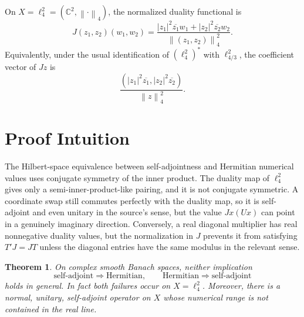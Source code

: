 \documentclass[11pt]{article}
\newtheorem{theorem}{Theorem}
\newcommand{\C}{\mathbb C}
\newcommand{\norm}[1]{\left\lVert #1 \right\rVert}
\begin{document}
On \(X=\ell_4^2=(\C^2,\norm{\cdot}_4)\), the normalized duality functional is
\[
  J(z_1,z_2)(w_1,w_2)
  =
  \frac{|z_1|^2\overline{z_1}w_1+|z_2|^2\overline{z_2}w_2}
       {\norm{(z_1,z_2)}_4^2}.
\]
Equivalently, under the usual identification of \((\ell_4^2)^*\) with
\(\ell_{4/3}^2\), the coefficient vector of \(Jz\) is
\[
  \frac{(|z_1|^2\overline{z_1}, |z_2|^2\overline{z_2})}{\norm{z}_4^2}.
\]

\section*{Proof Intuition}

The Hilbert-space equivalence between self-adjointness and Hermitian
numerical values uses conjugate symmetry of the inner product.  The duality
map of \(\ell_4^2\) gives only a semi-inner-product-like pairing, and it is not
conjugate symmetric.  A coordinate swap still commutes perfectly with the
duality map, so it is self-adjoint and even unitary in the source's sense, but
the value \(Jx(Ux)\) can point in a genuinely imaginary direction.  Conversely,
a real diagonal multiplier has real nonnegative duality values, but the
normalization in \(J\) prevents it from satisfying \(T'J=JT\) unless the
diagonal entries have the same modulus in the relevant sense.

\begin{theorem}
On complex smooth Banach spaces, neither implication
\[
  \text{self-adjoint} \Rightarrow \text{Hermitian},
  \qquad
  \text{Hermitian} \Rightarrow \text{self-adjoint}
\]
holds in general.  In fact both failures occur on \(X=\ell_4^2\).  Moreover,
there is a normal, unitary, self-adjoint operator on \(X\) whose numerical
range is not contained in the real line.
\end{theorem}
\end{document}
